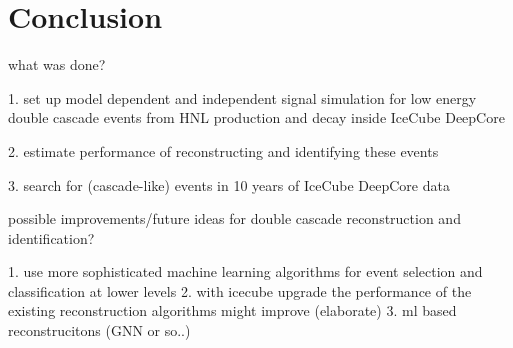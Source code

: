 \setchapterpreamble[u]{\margintoc}

\chapter{Conclusion}




what was done?

1. set up model dependent and independent signal simulation for low energy double cascade events from HNL production and decay inside IceCube DeepCore

2. estimate performance of reconstructing and identifying these events

3. search for (cascade-like) events in 10 years of IceCube DeepCore data



possible improvements/future ideas for double cascade reconstruction and identification?

1. use more sophisticated machine learning algorithms for event selection and classification at lower levels
2. with icecube upgrade the performance of the existing reconstruction algorithms might improve (elaborate)
3. ml based reconstrucitons (GNN or so..)
